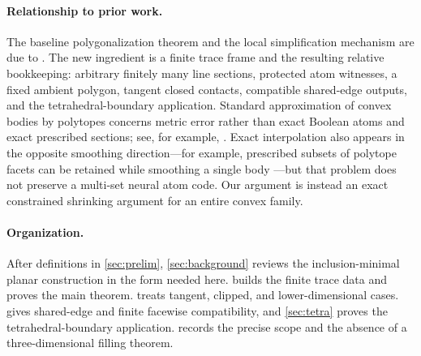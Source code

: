 \paragraph{Relationship to prior work.}
The baseline polygonalization theorem and the local simplification mechanism
are due to \citet{BukhJeffs2023}.  The new ingredient is a finite trace frame
and the resulting relative bookkeeping: arbitrary finitely many line
sections, protected atom witnesses, a fixed ambient polygon, tangent closed
contacts, compatible shared-edge outputs, and the tetrahedral-boundary
application.  Standard approximation of convex bodies by polytopes concerns
metric error rather than exact Boolean atoms and exact prescribed sections;
see, for example, \citet{SchneiderWieacker1981}.  Exact interpolation also
appears in the opposite smoothing direction---for example, prescribed
subsets of polytope facets can be retained while smoothing a single body
\citep{Ghomi2004}---but that problem does not preserve a multi-set neural
atom code.  Our argument is instead an exact constrained shrinking argument
for an entire convex family.

\paragraph{Organization.}
After definitions in \cref{sec:prelim}, \cref{sec:background} reviews the
inclusion-minimal planar construction in the form needed here.
 builds the finite trace data and proves the main theorem.
 treats tangent, clipped, and lower-dimensional cases.
 gives shared-edge and finite facewise compatibility,
and \cref{sec:tetra} proves the tetrahedral-boundary application.
 records the precise scope and the absence of a
three-dimensional filling theorem.
